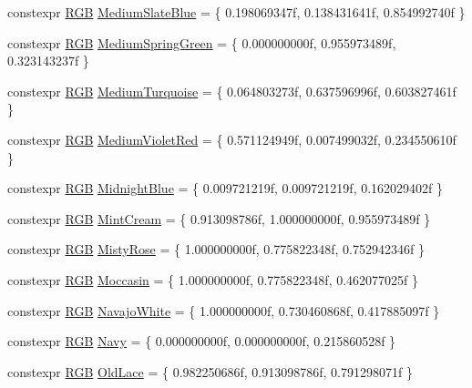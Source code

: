 \begin{DoxyCompactItemize}
\item 
constexpr \mbox{\hyperlink{structmage_1_1_r_g_b}{R\+GB}} \mbox{\hyperlink{namespacemage_1_1color_ac985e8c0e60c1a407ebb8190318e5f26}{Medium\+Slate\+Blue}} = \{ 0.\+198069347f, 0.\+138431641f, 0.\+854992740f \}
\item 
constexpr \mbox{\hyperlink{structmage_1_1_r_g_b}{R\+GB}} \mbox{\hyperlink{namespacemage_1_1color_ad301b4945f333081cdfe7e49e7db2bd3}{Medium\+Spring\+Green}} = \{ 0.\+000000000f, 0.\+955973489f, 0.\+323143237f \}
\item 
constexpr \mbox{\hyperlink{structmage_1_1_r_g_b}{R\+GB}} \mbox{\hyperlink{namespacemage_1_1color_addbe783ed9989a03f0a3033e47f4f7dc}{Medium\+Turquoise}} = \{ 0.\+064803273f, 0.\+637596996f, 0.\+603827461f \}
\item 
constexpr \mbox{\hyperlink{structmage_1_1_r_g_b}{R\+GB}} \mbox{\hyperlink{namespacemage_1_1color_aa122b0bf6b5374aaf7d77f1d4e9095ae}{Medium\+Violet\+Red}} = \{ 0.\+571124949f, 0.\+007499032f, 0.\+234550610f \}
\item 
constexpr \mbox{\hyperlink{structmage_1_1_r_g_b}{R\+GB}} \mbox{\hyperlink{namespacemage_1_1color_a973485679cfd59ce6ca47a4f96104a62}{Midnight\+Blue}} = \{ 0.\+009721219f, 0.\+009721219f, 0.\+162029402f \}
\item 
constexpr \mbox{\hyperlink{structmage_1_1_r_g_b}{R\+GB}} \mbox{\hyperlink{namespacemage_1_1color_a545b07f3dbe9d887c33cd6575123d88d}{Mint\+Cream}} = \{ 0.\+913098786f, 1.\+000000000f, 0.\+955973489f \}
\item 
constexpr \mbox{\hyperlink{structmage_1_1_r_g_b}{R\+GB}} \mbox{\hyperlink{namespacemage_1_1color_accc070278e15b17924142ac2cf2ffa7e}{Misty\+Rose}} = \{ 1.\+000000000f, 0.\+775822348f, 0.\+752942346f \}
\item 
constexpr \mbox{\hyperlink{structmage_1_1_r_g_b}{R\+GB}} \mbox{\hyperlink{namespacemage_1_1color_ade191f43672b1ee280fbd53fed9d5558}{Moccasin}} = \{ 1.\+000000000f, 0.\+775822348f, 0.\+462077025f \}
\item 
constexpr \mbox{\hyperlink{structmage_1_1_r_g_b}{R\+GB}} \mbox{\hyperlink{namespacemage_1_1color_a900d3e18327610b3a28909a4e2e0f28a}{Navajo\+White}} = \{ 1.\+000000000f, 0.\+730460868f, 0.\+417885097f \}
\item 
constexpr \mbox{\hyperlink{structmage_1_1_r_g_b}{R\+GB}} \mbox{\hyperlink{namespacemage_1_1color_a61827d5a9d3b434155ba49592e474222}{Navy}} = \{ 0.\+000000000f, 0.\+000000000f, 0.\+215860528f \}
\item 
constexpr \mbox{\hyperlink{structmage_1_1_r_g_b}{R\+GB}} \mbox{\hyperlink{namespacemage_1_1color_a7c9fc63a81fb81315a77b6a031a5309f}{Old\+Lace}} = \{ 0.\+982250686f, 0.\+913098786f, 0.\+791298071f \}

\end{DoxyCompactItemize}
